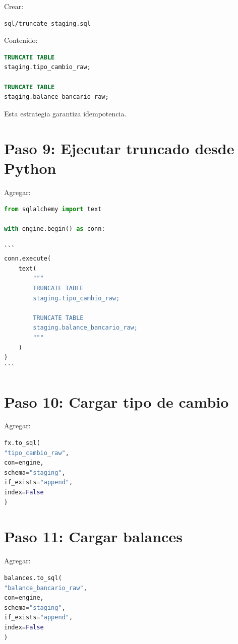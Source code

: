 Crear:

\begin{verbatim}
sql/truncate_staging.sql
\end{verbatim}

Contenido:

\begin{lstlisting}[language=SQL]
TRUNCATE TABLE
staging.tipo_cambio_raw;

TRUNCATE TABLE
staging.balance_bancario_raw;
\end{lstlisting}

Esta estrategia garantiza idempotencia.

\section{Paso 9: Ejecutar truncado desde Python}

Agregar:

\begin{lstlisting}[language=Python]
from sqlalchemy import text

with engine.begin() as conn:

```
conn.execute(
    text(
        """
        TRUNCATE TABLE
        staging.tipo_cambio_raw;

        TRUNCATE TABLE
        staging.balance_bancario_raw;
        """
    )
)
```

\end{lstlisting}

\section{Paso 10: Cargar tipo de cambio}

Agregar:

\begin{lstlisting}[language=Python]
fx.to_sql(
"tipo_cambio_raw",
con=engine,
schema="staging",
if_exists="append",
index=False
)
\end{lstlisting}

\section{Paso 11: Cargar balances}

Agregar:

\begin{lstlisting}[language=Python]
balances.to_sql(
"balance_bancario_raw",
con=engine,
schema="staging",
if_exists="append",
index=False
)
\end{lstlisting}

